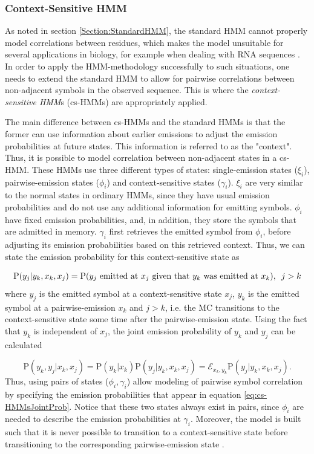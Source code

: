 \documentclass{article}\usepackage[]{graphicx}\usepackage[]{color}
\begin{document}
\subsubsection{Context-Sensitive HMM}
As noted in section \ref{Section:StandardHMM}, the standard HMM cannot properly model correlations between residues, which makes the model unsuitable for several applications in biology, for example when dealing with RNA sequences \cite{Yoon2009}. In order to apply the HMM-methodology successfully to such situations, one needs to extend the standard HMM to allow for pairwise correlations between non-adjacent symbols in the observed sequence. This is where the \textit{context-sensitive HMM}s (cs-HMMs) are appropriately applied.

The main difference between cs-HMMs and the standard HMMs is that the former can use information about earlier emissions to adjust the emission probabilities at future states. This information is referred to as the "context". Thus, it is possible to model correlation between non-adjacent states in a cs-HMM. These HMMs use three different types of states: single-emission states ($\xi_i$),  pairwise-emission states ($\phi_i$) and context-sensitive states ($\gamma_i$). $\xi_i$ are very similar to the normal states in ordinary HMMs, since they have usual emission probabilities and do not use any additional information for emitting symbols. $\phi_i$ have fixed emission probabilities, and, in addition, they store the symbols that are admitted in memory. $\gamma_i$ first retrieves the emitted symbol from $\phi_i$, before adjusting its emission probabilities based on this retrieved context. Thus, we can state the emission probability for this context-sensitive state as 

\begin{equation*}
    \text{P}(y_j|y_k, x_k, x_j) = \text{P}(y_j\text{ emitted at }x_j\text{ given that }y_k\text{ was emitted at }x_k), \hspace{0.5em} j>k
\end{equation*}
where $y_j$ is the emitted symbol at a context-sensitive state $x_j$, $y_k$ is the emitted symbol at a pairwise-emission $x_k$ and $j>k$, i.e. the MC transitions to the context-sensitive state some time after the pairwise-emission state. Using the fact that $y_k$ is independent of $x_j$, the joint emission probability of $y_k$ and $y_j$ can be calculated

\begin{equation*}
    \text{P}(y_k, y_j|x_k, x_j) = \text{P}(y_k|x_k)\text{P}(y_j|y_k, x_k, x_j) = \mathcal{E}_{x_k, y_k}\text{P}(y_j|y_k, x_k, x_j).
    \label{eq:cs-HMMsJointProb}
\end{equation*}
Thus, using pairs of states ($\phi_i, \gamma_i$) allow modeling of pairwise symbol correlation by specifying the emission probabilities that appear in equation \eqref{eq:cs-HMMsJointProb}. Notice that these two states always exist in pairs, since $\phi_i$ are needed to describe the emission probabilities at $\gamma_i$. Moreover, the model is built such that it is never possible to transition to a context-sensitive state before transitioning to the corresponding pairwise-emission state \cite{Yoon2009}. 
\end{document}
